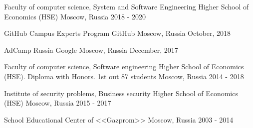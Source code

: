 

\cventryeducation
{Faculty of computer science, System and Software Engineering} %
{Higher School of Economics (HSE)} %
{Moscow, Russia} %
{2018 - 2020} %

\cventryeducation
{GitHub Campus Experts Program} %
{GitHub} %
{Moscow, Russia} %
{October, 2018} %

\cventryeducation
{AdCamp Russia} %
{Google} %
{Moscow, Russia} %
{December, 2017} %

\cventryeducation
{Faculty of computer science, Software engineering} %
{Higher School of Economics (HSE). Diploma with Honors. 1st out 87 students} %
{Moscow, Russia} %
{2014 - 2018} %

\cventryeducation
{Institute of security problems, Business security} %
{Higher School of Economics (HSE)} %
{Moscow, Russia} %
{2015 - 2017} %

\cventryeducation
{School} %
{Educational Center of <<Gazprom>>} %
{Moscow, Russia} %
{2003 - 2014} %


